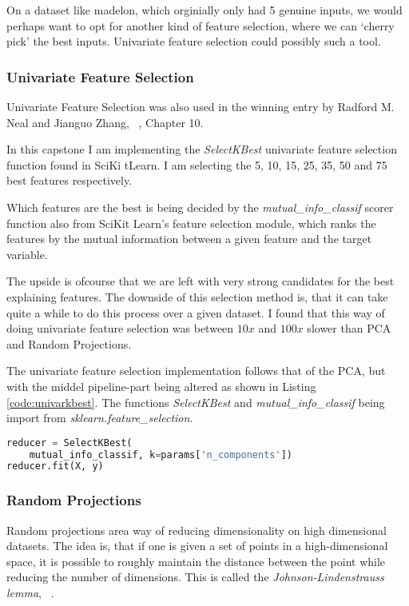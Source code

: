 \documentclass[12pt]{article}
\begin{document}
On a dataset like madelon, which orginially only had 5 genuine inputs, we would perhaps want to opt for another kind of feature selection, where we can `cherry pick' the best inputs. Univariate feature selection could possibly such a tool.

\subsubsection{Univariate Feature Selection}

Univariate Feature Selection was also used in the winning entry by Radford M. Neal and Jianguo Zhang, ~\cite{nips03book}, Chapter 10.

In this capstone I am implementing the \emph{SelectKBest} univariate feature selection function found in SciKi tLearn. I am selecting the 5, 10, 15, 25, 35, 50 and 75 best features respectively.

Which features are the best is being decided by the \emph{mutual\_info\_classif} scorer function also from SciKit Learn's feature selection module, which ranks the features by the mutual information between a given feature and the target variable.

The upside is ofcourse that we are left with very strong candidates for the best explaining features. The downside of this selection method is, that it can take quite a while to do this process over a given dataset. I found that this way of doing univariate feature selection was between $10x$ and $100x$ slower than PCA and Random Projections.

The univariate feature selection implementation follows that of the PCA, but with the middel pipeline-part being altered as shown in Listing \ref{code:univarkbest}. The functions \emph{SelectKBest} and \emph{mutual\_info\_classif}  being import from \emph{sklearn.feature\_selection}.

\begin{lstlisting}[language=python,frame=single,caption=Univariate Feature Selection Implementation, label=code:univarkbest]
reducer = SelectKBest(
    mutual_info_classif, k=params['n_components'])
reducer.fit(X, y)
\end{lstlisting}


\subsubsection{Random Projections}

Random projections area way of reducing dimensionality on high dimensional datasets. The idea is, that if one is given a set of points in a high-dimensional space, it is possible to roughly maintain the distance between the point while reducing the number of dimensions. This is called the \emph{Johnson-Lindenstrauss lemma}, ~\cite{wiki:jll}.
\end{document}
